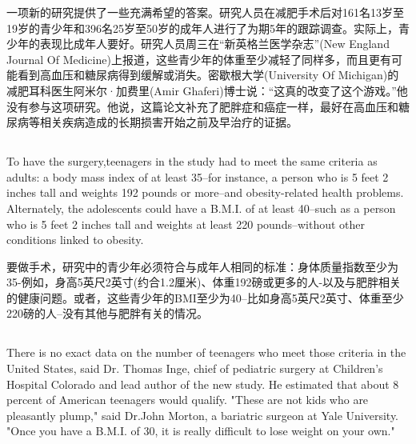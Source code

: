 \documentclass[]{article}
\begin{document}
一项新的研究提供了一些充满希望的答案。研究人员在减肥手术后对161名13岁至19岁的青少年和396名25岁至50岁的成年人进行了为期5年的跟踪调查。实际上，青少年的表现比成年人要好。研究人员周三在“新英格兰医学杂志”(New England Journal Of Medicine)上报道，这些青少年的体重至少减轻了同样多，而且更有可能看到高血压和糖尿病得到缓解或消失。密歇根大学(University Of Michigan)的减肥耳科医生阿米尔·加费里(Amir Ghaferi)博士说：“这真的改变了这个游戏。”他没有参与这项研究。他说，这篇论文补充了肥胖症和癌症一样，最好在高血压和糖尿病等相关疾病造成的长期损害开始之前及早治疗的证据。

\subsection{}
\begin{spacing}{2.0}
	{\Large To have the surgery,teenagers in the study had to meet the same criteria as adults: a body mass index of at least 35--for instance, a person who is 5 feet 2 inches tall and weights 192 pounds or more--and obesity-related health problems. Alternately, the adolescents could have a B.M.I. of at least 40--such as a person who is 5 feet 2 inches tall and weights at least 220 pounds--without other conditions linked to obesity.}\newline
\end{spacing}

要做手术，研究中的青少年必须符合与成年人相同的标准：身体质量指数至少为35-例如，身高5英尺2英寸(约合1.2厘米)、体重192磅或更多的人-以及与肥胖相关的健康问题。或者，这些青少年的BMI至少为40--比如身高5英尺2英寸、体重至少220磅的人--没有其他与肥胖有关的情况。

\subsection{}
\begin{spacing}{2.0}
	{\Large There is no exact data on the number of teenagers who meet those criteria in the United States, said Dr. Thomas Inge, chief of pediatric surgery at Children's Hospital Colorado and lead author of the new study. He estimated that about 8 percent of American teenagers would qualify. "These are not kids who are pleasantly plump," said Dr.John Morton, a bariatric surgeon at Yale University. "Once you have a B.M.I. of 30, it is really difficult to lose weight on your own."}\newline
	
\end{spacing}
\end{document}
